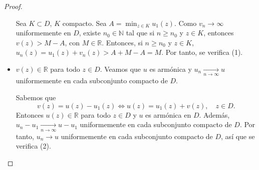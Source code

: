 \begin{proof}
\begin{itemize}
              Sea $K \subset D$, $K$ compacto.
              Sea $A = \min_{z \in K} u_1(z)$.
              Como $v_n \to \infty$ uniformemente en $D$, existe $n_0 \in \mathbb{N}$ tal que si $n \geq n_0$ y $z \in K$, entonces $v(z) > M-A$, con $M \in \mathbb{R}$.
              Entonces, si $n \geq n_0$ y $z \in K$, $u_n(z) = u_1(z) + v_n(z) > A + M - A = M$.
              Por tanto, se verifica (1).

        \item $v(z) \in \mathbb{R}$ para todo $z \in D$.
              Veamos que $u$ es armónica y $u_n \xrightarrow[n \to \infty]{} u$ uniformemente en cada subconjunto compacto de $D$.

              Sabemos que
              $$v(z) = u(z) - u_1(z) \Leftrightarrow u(z) = u_1(z) + v(z), \quad z \in D.$$
              Entonces $u(z) \in \mathbb{R}$ para todo $z \in D$ y $u$ es armónica en $D$.
              Además, $u_n - u_1 \xrightarrow[n \to \infty]{} u-u_1$ uniformemente en cada subconjunto compacto de $D$.
              Por tanto, $u_n \to u$ uniformemente en cada subconjunto compacto de $D$, así que se verifica (2).
    \end{itemize}
\end{proof}